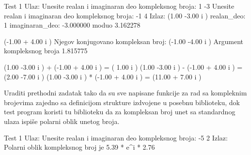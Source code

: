 \begin{Exercise}[label=001]
\begin{maxitest}
\begin{test}{Test 1}
Ulaz:    Unesite realan i imaginaran deo kompleksnog broja: 1 -3 
         Unesite realan i imaginaran deo kompleksnog broja: -1 4 
Izlaz:   (1.00 -3.00 i )
          realan_deo: 1
          imaginaran_deo: -3.000000
          moduo 3.162278

          (-1.00 + 4.00 i )
          Njegov konjugovano kompleksan broj: (-1.00 -4.00 i )
          Argument kompleksnog broja 1.815775

          (1.00 -3.00 i ) + (-1.00 + 4.00 i )  =  ( 1.00 i )
          (1.00 -3.00 i ) - (-1.00 + 4.00 i )  =  (2.00 -7.00 i )
          (1.00 -3.00 i ) * (-1.00 + 4.00 i )  =  (11.00 + 7.00 i ) 
\end{test}
\end{maxitest}


\end{Exercise}
\begin{Answer}[ref=001]
\end{Answer}

\begin{Exercise}[label=002] %
Uraditi prethodni zadatak tako da su sve napisane funkcije za rad sa kompleknim brojevima zajedno sa definicijom strukture  izdvojene u posebnu biblioteku, dok test program koristi tu biblioteku da za kompleksan broj unet sa standardnog ulaza ispiše polarni oblik unetog broja.

\begin{maxitest}
\begin{test}{Test 1}
Ulaz:   Unesite realan i imaginaran deo kompleksnog broja: -5 2 
Izlaz:   Polarni oblik kompleksnog broj je 5.39 *  e^i * 2.76
\end{test}
\end{maxitest}


\end{Exercise}
\begin{Answer}[ref=002]
\end{Answer}



